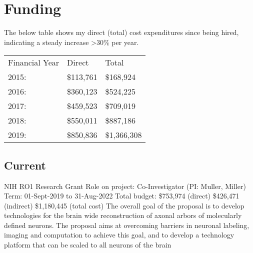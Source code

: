 \documentclass[10pt,colorlinks=true,urlcolor=blue]{moderncv}
\begin{document}
\begin{refsection} %
\nocite{*}
\printbibliography[%
    title=\href{https://neurodata.io/publications/\#pre_prints}{Manuscripts in Preparation for Submission},%
    heading=subbibliography%
    ]
\end{refsection}

%
\newpage
\section{Funding}

The below table shows my direct (total) cost expenditures since being hired, indicating a steady increase >30\% per year.

\centering
\begin{tabular}{p{3cm}p{2cm}p{3cm}}
Financial Year & Direct & Total \\
2015: & \$113,761 & \$168,924 \\
2016: & \$360,123 & \$524,225 \\
2017: & \$459,523 & \$709,019 \\
2018: & \$550,011 & \$887,186 \\
2019: & \$850,836 & \$1,366,308
\end{tabular}


\subsection{Current}
{\newline NIH RO1 Research Grant
\newline Role on project: Co-Investigator (PI: Muller, Miller)
\newline Term: 01-Sept-2019 to 31-Aug-2022
\newline Total budget: \$753,974 (direct) \$426,471 (indirect) \$1,180,445 (total cost)
\newline The overall goal of the proposal is to develop technologies for the brain wide reconstruction
of axonal arbors of molecularly defined neurons. The proposal aims at overcoming barriers
in neuronal labeling, imaging and computation to achieve this goal, and to develop a
technology platform that can be scaled to all neurons of the brain}{}{}{}{}
\end{document}

